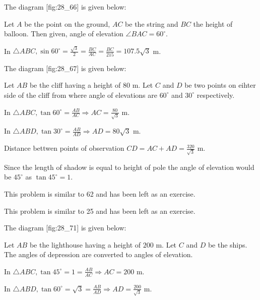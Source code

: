\item The diagram [fig:28_66] is given below:

  \startplacefigure[reference=fig:28_66]
    \externalfigure[28_66.pdf]
  \stopplacefigure

  Let $A$ be the point on the ground, $AC$ be the string and $BC$ the height of balloon. Then given, angle of
  elevation $\angle BAC = 60^\circ$.

  In $\triangle ABC, \sin60^\circ = \frac{\sqrt{3}}{2} = \frac{BC}{AC} = \frac{BC}{215} = 107.5\sqrt{3}$ m.

\item The diagram [fig:28_67] is given below:

  \startplacefigure[reference=fig:28_67]
    \externalfigure[28_67.pdf]
  \stopplacefigure

  Let $AB$ be the cliff having a height of $80$ m. Let $C$ and $D$ be two points on eihter side of the
  cliff from where angle of elevations are $60^\circ$ and $30^\circ$ respectively.

  In $\triangle ABC, \tan60^\circ = \frac{AB}{AC} \Rightarrow AC = \frac{80}{\sqrt{3}}$ m.

  In $\triangle ABD, \tan30^\circ = \frac{AB}{AD}\Rightarrow AD = 80\sqrt{3}$ m.

  Distance bettwen points of observation $CD = AC + AD = \frac{320}{\sqrt{3}}$ m.

\item Since the length of shadow is equal to height of pole the angle of elevation would be $45^\circ$ as $\tan45^\circ =
  1$.

\item This problem is similar to 62 and has been left as an exercise.

\item This problem is similar to 25 and has been left as an exercise.

\item The diagram [fig:28_71] is given below:

  \startplacefigure[reference=fig:28_71]
    \externalfigure[28_71.pdf]
  \stopplacefigure

  Let $AB$ be the lighthouse having a height of $200$ m. Let $C$ and $D$ be the ships. The angles of
  depression are converted to angles of elevation.

  In $\triangle ABC, \tan45^\circ = 1 = \frac{AB}{AC}\Rightarrow AC = 200$ m.

  In $\triangle ABD, \tan60^\circ = \sqrt{3} = \frac{AB}{AD} \Rightarrow AD = \frac{200}{\sqrt{3}}$ m.

